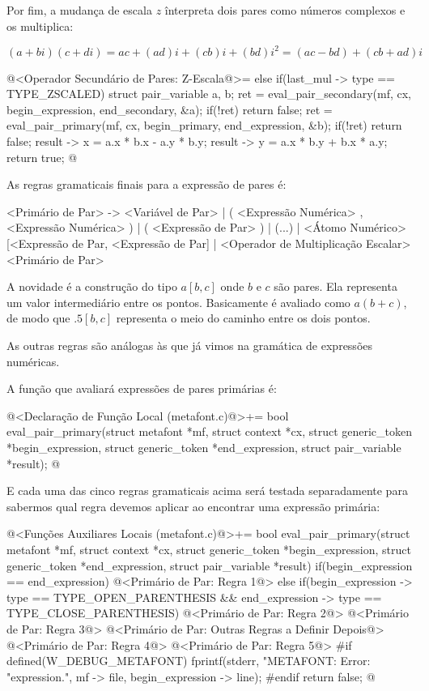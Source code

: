 Por fim, a mudança de escala $z$ înterpreta dois pares como números
complexos e os multiplica:

$$
(a+bi)(c+di) = ac + (ad)i + (cb)i + (bd)i^2 = (ac - bd) + (cb+ad)i
$$

\iniciocodigo
@<Operador Secundário de Pares: Z-Escala@>=
else if(last_mul -> type == TYPE_ZSCALED){
  struct pair_variable a, b;
  ret = eval_pair_secondary(mf, cx, begin_expression, end_secondary, &a);
  if(!ret)
    return false;
  ret = eval_pair_primary(mf, cx, begin_primary, end_expression, &b);
  if(!ret)
    return false;
  result -> x = a.x * b.x - a.y * b.y;
  result -> y = a.x * b.y + b.x * a.y;
  return true;
}
@
\fimcodigo


As regras gramaticais finais para a expressão de pares é:

\alinhaverbatim
<Primário de Par> -> <Variável de Par> |
                     ( <Expressão Numérica> , <Expressão Numérica> ) |
                     ( <Expressão de Par> ) |
                     (...) |
                     <Átomo Numérico>[<Expressão de Par,
                                      <Expressão de Par]  |
                     <Operador de Multiplicação Escalar><Primário de Par>
\alinhanormal

A novidade é a construção do tipo $a[b, c]$ onde $b$ e $c$ são
pares. Ela representa um valor intermediário entre os
pontos. Basicamente é avaliado como $a(b+c)$, de modo que $.5[b,c]$
representa o meio do caminho entre os dois pontos.

As outras regras são análogas às que já vimos na gramática de
expressões numéricas.

A função que avaliará expressões de pares primárias é:

\iniciocodigo
@<Declaração de Função Local (metafont.c)@>+=
bool eval_pair_primary(struct metafont *mf, struct context *cx,
                       struct generic_token *begin_expression,
                       struct generic_token *end_expression,
                       struct pair_variable *result);
@
\fimcodigo

E cada uma das cinco regras gramaticais acima será testada
separadamente para sabermos qual regra devemos aplicar ao encontrar
uma expressão primária:

\iniciocodigo
@<Funções Auxiliares Locais (metafont.c)@>+=
bool eval_pair_primary(struct metafont *mf, struct context *cx,
                       struct generic_token *begin_expression,
                       struct generic_token *end_expression,
                       struct pair_variable *result){
  if(begin_expression == end_expression){
    @<Primário de Par: Regra 1@>
  }
  else if(begin_expression -> type == TYPE_OPEN_PARENTHESIS &&
          end_expression -> type == TYPE_CLOSE_PARENTHESIS){
    @<Primário de Par: Regra 2@>
    @<Primário de Par: Regra 3@>
  }
  @<Primário de Par: Outras Regras a Definir Depois@>
  @<Primário de Par: Regra 4@>
  @<Primário de Par: Regra 5@>
#if defined(W_DEBUG_METAFONT)
  fprintf(stderr, "METAFONT: Error: %
          "expression.\n",  mf -> file, begin_expression -> line);
#endif
  return false;
}
@

